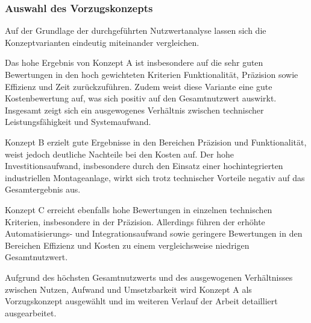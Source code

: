 \subsubsection{Auswahl des Vorzugskonzepts}
Auf der Grundlage der durchgeführten Nutzwertanalyse lassen sich die Konzeptvarianten eindeutig miteinander vergleichen.

Das hohe Ergebnis von Konzept A ist insbesondere auf die sehr guten Bewertungen in den hoch gewichteten Kriterien Funktionalität, Präzision sowie Effizienz und Zeit zurückzuführen. Zudem weist diese Variante eine gute Kostenbewertung auf, was sich positiv auf den Gesamtnutzwert auswirkt. Insgesamt zeigt sich ein ausgewogenes Verhältnis zwischen technischer Leistungsfähigkeit und Systemaufwand.

Konzept B erzielt gute Ergebnisse in den Bereichen Präzision und Funktionalität, weist jedoch deutliche Nachteile bei den Kosten auf. Der hohe Investitionsaufwand, insbesondere durch den Einsatz einer hochintegrierten industriellen Montageanlage, wirkt sich trotz technischer Vorteile negativ auf das Gesamtergebnis aus.

Konzept C erreicht ebenfalls hohe Bewertungen in einzelnen technischen Kriterien, insbesondere in der Präzision. Allerdings führen der erhöhte Automatisierungs- und Integrationsaufwand sowie geringere Bewertungen in den Bereichen Effizienz und Kosten zu einem vergleichsweise niedrigen Gesamtnutzwert.

Aufgrund des höchsten Gesamtnutzwerts und des ausgewogenen Verhältnisses zwischen Nutzen, Aufwand und Umsetzbarkeit wird Konzept A als Vorzugskonzept ausgewählt und im weiteren Verlauf der Arbeit detailliert ausgearbeitet.